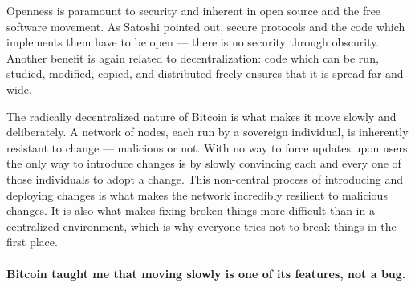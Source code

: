 Openness is paramount to security and inherent in open source and the
free software movement. As Satoshi pointed out, secure protocols and the
code which implements them have to be open --- there is no security
through obscurity. Another benefit is again related to decentralization:
code which can be run, studied, modified, copied, and distributed freely
ensures that it is spread far and wide.

The radically decentralized nature of Bitcoin is what makes it move
slowly and deliberately. A network of nodes, each run by a sovereign
individual, is inherently resistant to change --- malicious or not. With
no way to force updates upon users the only way to introduce changes is
by slowly convincing each and every one of those individuals to adopt a
change. This non-central process of introducing and deploying changes is
what makes the network incredibly resilient to malicious changes. It is
also what makes fixing broken things more difficult than in a
centralized environment, which is why everyone tries not to break things
in the first place.

\paragraph{Bitcoin taught me that moving slowly is one of its features, not a
bug.}

%
%
%
%
%
%
%
